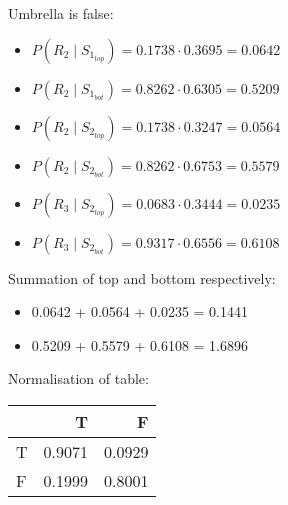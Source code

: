 \documentclass[colorlinks=true,linkcolor=blue]{article}
\begin{document}
Umbrella is false:
\begin{itemize}
\item $P(R_2 \mid S_{1_{top}}) = 0.1738 \cdot 0.3695 = 0.0642$
\item $P(R_2 \mid S_{1_{bot}}) = 0.8262 \cdot 0.6305 = 0.5209$
\item $P(R_2 \mid S_{2_{top}}) = 0.1738 \cdot 0.3247 = 0.0564$
\item $P(R_2 \mid S_{2_{bot}}) = 0.8262 \cdot 0.6753 = 0.5579$
\item $P(R_3 \mid S_{2_{top}}) = 0.0683 \cdot 0.3444 = 0.0235$
\item $P(R_3 \mid S_{2_{bot}}) = 0.9317 \cdot 0.6556 = 0.6108$
\end{itemize}

Summation of top and bottom respectively:
\begin{itemize}
\item 0.0642 + 0.0564 + 0.0235 = 0.1441
\item 0.5209 + 0.5579 + 0.6108 = 1.6896
\end{itemize}

Normalisation of table:
\begin{center}
\begin{tabular}{l|rr}
 & T & F\\
\hline
T & 0.9071 & 0.0929\\
F & 0.1999 & 0.8001\\
\end{tabular}
\end{center}
\end{document}
